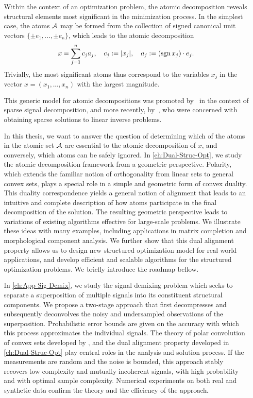 Within the context of an optimization problem, the atomic decomposition reveals
structural elements most significant in the minimization process.
In the simplest case, the atoms $\mathcal{A}$ may be formed from the collection of
signed canonical unit vectors $\{\pm e_1,\ldots,\pm e_n\}$, which leads to the
atomic decomposition
\[
  x = \sum_{j=1}^n c_j a_j,
  \quad
  c_j: = |x_j|,
  \quad
  a_j:= (\operatorname{sgn} x_j)\cdot e_j.
\]
Trivially, the most significant atoms thus correspond to the variables $x_j$ in
the vector $x=(x_1,\ldots,x_n)$ with the largest magnitude.

This generic model for atomic decompositions was promoted by~\citet{cds98} in the context of sparse signal decomposition, and more recently, by~\citet{chandrasekaran2012convex}, who were concerned with obtaining sparse solutions to linear inverse problems. 

In this thesis, we want to answer the question of determining which of the atoms in the atomic set $\mathcal{A}$ are essential to the atomic decomposition of $x$, and conversely, which atoms can be safely ignored. In \autoref{ch:Dual-Struc-Opt}, we study the atomic decomposition framework from a geometric perspective. Polarity, which extends the familiar notion of orthogonality from linear sets to general convex sets, plays a special role in a simple and geometric form of convex duality. This duality correspondence yields a general notion of alignment that leads to an intuitive and complete description of how atoms participate in the final decomposition of the solution. The resulting geometric perspective leads to variations of existing algorithms effective for large-scale problems. We illustrate these ideas with many examples, including applications in matrix completion and morphological component analysis. We further show that this dual alignment property allows us to design new structured optimization model for real world applications, and develop efficient and scalable algorithms for the structured optimization problems. We briefly introduce the roadmap bellow. 

In \autoref{ch:App-Sig-Demix}, we study the signal demixing problem which seeks to separate a superposition of multiple signals into its constituent structural components. We propose a two-stage approach that first decompresses and subsequently deconvolves the noisy and undersampled observations of the superposition. Probabilistic error bounds are given on the accuracy with which this process approximates the individual signals. The theory of polar convolution of convex sets developed by \citet{friedlander2019polarconvolution}, and the dual alignment property developed in \autoref{ch:Dual-Struc-Opt} play central roles in the analysis and solution process. If the measurements are random and the noise is bounded, this approach stably recovers low-complexity and mutually incoherent signals, with high probability and with optimal sample complexity. Numerical experiments on both real and synthetic data confirm the theory and the efficiency of the approach.

